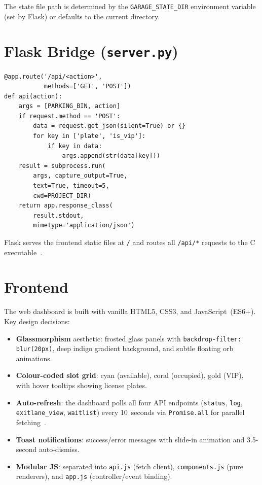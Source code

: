 \documentclass[12pt, a4paper]{report}
\begin{document}
The state file path is determined by the \texttt{GARAGE\_STATE\_DIR}
environment variable (set by Flask) or defaults to the current
directory.

\section{Flask Bridge (\texttt{server.py})}

\begin{lstlisting}[style=pythonstyle, caption={Core Flask routing logic}]
@app.route('/api/<action>',
           methods=['GET', 'POST'])
def api(action):
    args = [PARKING_BIN, action]
    if request.method == 'POST':
        data = request.get_json(silent=True) or {}
        for key in ['plate', 'is_vip']:
            if key in data:
                args.append(str(data[key]))
    result = subprocess.run(
        args, capture_output=True,
        text=True, timeout=5,
        cwd=PROJECT_DIR)
    return app.response_class(
        result.stdout,
        mimetype='application/json')
\end{lstlisting}

Flask serves the frontend static files at \texttt{/} and routes all
\texttt{/api/*} requests to the C executable~\cite{flask2024}.

\section{Frontend}

The web dashboard is built with vanilla HTML5, CSS3, and
JavaScript~(ES6+).  Key design decisions:

\begin{itemize}[nosep]
  \item \textbf{Glassmorphism} aesthetic: frosted glass panels with
        \texttt{backdrop-filter: blur(20px)}, deep indigo gradient
        background, and subtle floating orb animations.
  \item \textbf{Colour-coded slot grid}: cyan (available), coral
        (occupied), gold (VIP), with hover tooltips showing license
        plates.
  \item \textbf{Auto-refresh}: the dashboard polls all four API
        endpoints (\texttt{status}, \texttt{log}, \texttt{exitlane\_view},
        \texttt{waitlist}) every 10~seconds via \texttt{Promise.all} for
        parallel fetching~\cite{mdn2024}.
  \item \textbf{Toast notifications}: success/error messages with
        slide-in animation and 3.5-second auto-dismiss.
  \item \textbf{Modular JS}: separated into \texttt{api.js} (fetch
        client), \texttt{components.js} (pure renderers), and
        \texttt{app.js} (controller/event binding).
\end{itemize}
\end{document}
